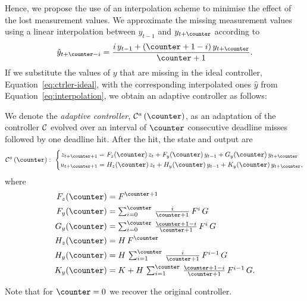 Hence, we propose the use of an interpolation scheme to minimise the effect of the lost measurement values.
We approximate the missing measurement values using a linear interpolation between $y_{t-1}$ and $y_{t+\counter}$ according to
%
\begin{equation}
    \label{eq:interpolation}
    \hat y_{t+\counter-i} = \frac{i\, y_{t-1} + (\counter+1-i)\, y_{t+\counter}}{\counter+1} .
\end{equation}
%
If we substitute the values of $y$ that are missing in the ideal controller, Equation~\eqref{eq:ctrler-ideal}, with the corresponding interpolated ones $\hat y$ from Equation~\eqref{eq:interpolation}, we obtain an adaptive controller as follows:

\begin{definition}%
    We denote the \emph{adaptive controller}, $\ctrler^a\funof{\counter}$, as an adaptation of the controller $\mathcal{C}$ evolved over an interval of $\counter$ consecutive deadline misses followed by one deadline hit.
    After the hit, the state and output are
    \begin{equation}
        \label{eq:adaptive}
        \ctrler^a\funof{\counter}: \,\,
        \left\{
            \begin{aligned}
                z_{t+\counter+1} &= F_z(\counter)\,z_{t} +  F_y(\counter)\,y_{t-1} + G_y(\counter)\,y_{t+\counter} \\
                u_{t+\counter+1} &= H_z(\counter)\,z_{t} + H_y(\counter)\,y_{t-1} + K_y(\counter)\,y_{t+\counter},
            \end{aligned}\right.
    \end{equation}
    where
    \begin{equation*}
        \begin{aligned}
            \Ac_z(\counter) &= \Ac^{\counter+1} \\
            \Ac_y(\counter) &= \textstyle\sum\nolimits_{i=0}^{\counter}\, \tfrac{i}{\counter+1}\, \Ac^{i}\, \Bc \\
            \Bc_y(\counter) &= \textstyle\sum\nolimits_{i=0}^{\counter}\, \tfrac{\counter+1-i}{\counter+1}\, \Ac^{i}\, \Bc \\
            \Cc_z(\counter) &= \Cc\, \Ac^\counter \\
            \Cc_y(\counter) &= \Cc\, \textstyle\sum\nolimits_{i=1}^{\counter}\, \tfrac{i}{\counter+1}\, \Ac^{i-1}\, \Bc \\
            \Dc_y(\counter) &= \Dc + \Cc\, \textstyle\sum\nolimits_{i=1}^{\counter}\, \tfrac{\counter+1-i}{\counter+1}\, \Ac^{i-1}\, \Bc.
        \end{aligned}
    \end{equation*}
\end{definition}
Note that for $\counter = 0$ we recover the original controller.

